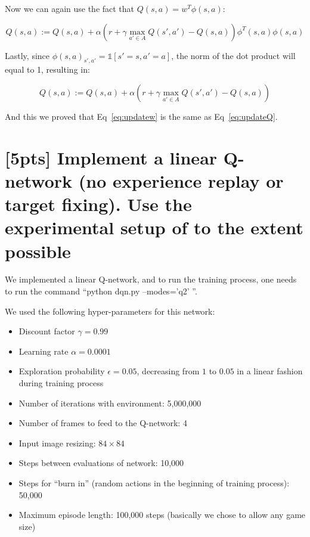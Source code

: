 \documentclass{article}
\begin{document}
Now we can again use the fact that $Q(s,a)=w^T\phi(s,a)$:

\begin{equation} \label{eq:derivation_3}
  Q(s,a) := Q(s,a) + \alpha \left(r+\gamma \max_{a' \in A} Q(s',a') - Q(s,a)\right) \phi^T(s,a) \phi(s,a)
\end{equation}

Lastly, since $\phi(s,a)_{s',a'} = \mathbb{1}[s'=s, a'=a]$, the norm of the dot product will equal to 1, resulting in:

\begin{equation} \label{eq:derivation_4}
  Q(s,a) := Q(s,a) + \alpha \left(r+\gamma \max_{a' \in A} Q(s',a') - Q(s,a)\right)
\end{equation}

And this we proved that Eq~\ref{eq:updatew} is the same as Eq~\ref{eq:updateQ}.

\section{[5pts] Implement a linear Q-network (no experience replay or target fixing). Use the experimental setup of \cite{mnih2013playing,mnih2015human} to the extent possible}

We implemented a linear Q-network, and to run the training process, one needs to run the command ``python dqn.py --modes='q2' ''.

We used the following hyper-parameters for this network:
\begin{itemize}
  \item Discount factor $\gamma=0.99$
  \item Learning rate $\alpha=0.0001$
  \item Exploration probability $\epsilon=0.05$, decreasing from $1$ to $0.05$ in a linear fashion during training process
  \item Number of iterations with environment: 5,000,000
  \item Number of frames to feed to the Q-network: 4
  \item Input image resizing: $84\times84$
  \item Steps between evaluations of network: 10,000
  \item Steps for ``burn in'' (random actions in the beginning of training process): 50,000
  \item Maximum episode length: 100,000 steps (basically we chose to allow any game size)
\end{itemize}
\end{document}
